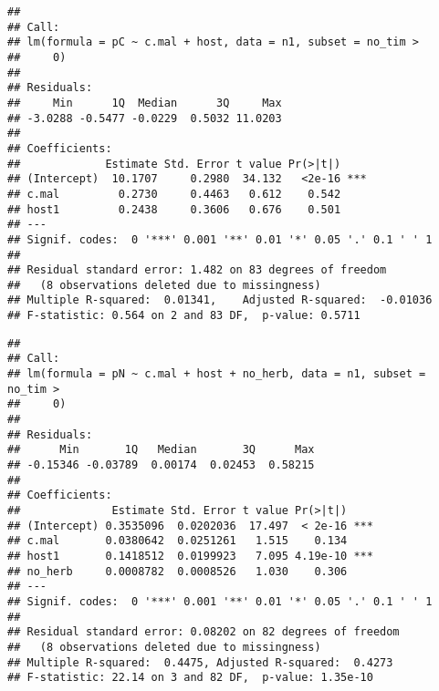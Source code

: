 \documentclass[]{article}
\newenvironment{Shaded}{\begin{snugshade}}{\end{snugshade}}
\newcommand{\KeywordTok}[1]{\textcolor[rgb]{0.13,0.29,0.53}{\textbf{#1}}}
\newcommand{\DataTypeTok}[1]{\textcolor[rgb]{0.13,0.29,0.53}{#1}}
\newcommand{\DecValTok}[1]{\textcolor[rgb]{0.00,0.00,0.81}{#1}}
\newcommand{\StringTok}[1]{\textcolor[rgb]{0.31,0.60,0.02}{#1}}
\newcommand{\OperatorTok}[1]{\textcolor[rgb]{0.81,0.36,0.00}{\textbf{#1}}}
\newcommand{\NormalTok}[1]{#1}
\begin{document}
\begin{verbatim}
## 
## Call:
## lm(formula = pC ~ c.mal + host, data = n1, subset = no_tim > 
##     0)
## 
## Residuals:
##     Min      1Q  Median      3Q     Max 
## -3.0288 -0.5477 -0.0229  0.5032 11.0203 
## 
## Coefficients:
##             Estimate Std. Error t value Pr(>|t|)    
## (Intercept)  10.1707     0.2980  34.132   <2e-16 ***
## c.mal         0.2730     0.4463   0.612    0.542    
## host1         0.2438     0.3606   0.676    0.501    
## ---
## Signif. codes:  0 '***' 0.001 '**' 0.01 '*' 0.05 '.' 0.1 ' ' 1
## 
## Residual standard error: 1.482 on 83 degrees of freedom
##   (8 observations deleted due to missingness)
## Multiple R-squared:  0.01341,    Adjusted R-squared:  -0.01036 
## F-statistic: 0.564 on 2 and 83 DF,  p-value: 0.5711
\end{verbatim}

\begin{Shaded}
\end{Shaded}

\begin{verbatim}
## 
## Call:
## lm(formula = pN ~ c.mal + host + no_herb, data = n1, subset = no_tim > 
##     0)
## 
## Residuals:
##      Min       1Q   Median       3Q      Max 
## -0.15346 -0.03789  0.00174  0.02453  0.58215 
## 
## Coefficients:
##              Estimate Std. Error t value Pr(>|t|)    
## (Intercept) 0.3535096  0.0202036  17.497  < 2e-16 ***
## c.mal       0.0380642  0.0251261   1.515    0.134    
## host1       0.1418512  0.0199923   7.095 4.19e-10 ***
## no_herb     0.0008782  0.0008526   1.030    0.306    
## ---
## Signif. codes:  0 '***' 0.001 '**' 0.01 '*' 0.05 '.' 0.1 ' ' 1
## 
## Residual standard error: 0.08202 on 82 degrees of freedom
##   (8 observations deleted due to missingness)
## Multiple R-squared:  0.4475, Adjusted R-squared:  0.4273 
## F-statistic: 22.14 on 3 and 82 DF,  p-value: 1.35e-10
\end{verbatim}
\end{document}
